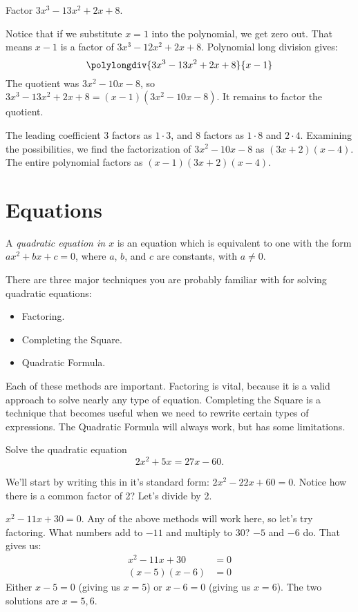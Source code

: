 \documentclass{ximera}
\begin{document}
\begin{example}
	Factor $3x^3-13x^2+2x+8$.
	\begin{explanation}
		Notice that if we substitute $x=1$ into the polynomial, we get zero out.  That means $x-1$ is a factor of $3x^3-12x^2+2x+8$.
		Polynomial long division gives:
		\[\polylongdiv{3x^3-13x^2+2x+8}{x-1}\]
		The quotient was $3x^2-10x-8$, so $3x^3-13x^2+2x+8 = (x-1)(3x^2-10x-8)$.  It remains to factor the quotient.
		
		The leading coefficient $3$ factors as $1 \cdot 3$, and $8$ factors as $1 \cdot 8$ and $2 \cdot 4$.  Examining the possibilities, we find the factorization
		of $3x^2-10x-8$ as $(3x+2)(x-4)$.  The entire polynomial factors as $(x-1)(3x+2)(x-4)$.
	\end{explanation}
\end{example}



\section{Equations}
A \emph{quadratic equation in $x$} is an equation which is equivalent to one with the form
	$ax^2 + bx + c = 0$, where $a$, $b$, and $c$ are constants, with $a \neq 0$.

There are three major techniques you are probably familiar with for solving quadratic equations:
\begin{itemize}
	\item Factoring.
	\item Completing the Square.
	\item Quadratic Formula.
\end{itemize}

Each of these methods are important.  Factoring is vital, because it is a valid approach to solve nearly any type of equation.  Completing
the Square is a technique that becomes useful when we need to rewrite certain types of expressions.  The Quadratic Formula will always
work, but has some limitations.

\begin{example}
	Solve the quadratic equation
	\[ 2x^2 +5x = 27 x - 60. \]
	\begin{explanation}
		We'll start by writing this in it's standard form: $2x^2 - 22x + 60 = 0$.  Notice how there is a common factor of 2? Let's divide by 2.
		
		$x^2 - 11x + 30 = 0$.  Any of the above methods will work here, so let's try factoring.  What numbers add to $-11$ and multiply to $30$?
		$-5$ and $-6$ do. That gives us:
		\begin{align*}
			x^2 - 11x + 30 &= 0\\
			(x-5)(x-6) &= 0
		\end{align*}
		Either $x-5 = 0$ (giving us $x=5$) or $x-6 = 0$ (giving us $x=6$).  The two solutions are $x = 5, 6$.
	\end{explanation}
\end{example}	
\end{document}
